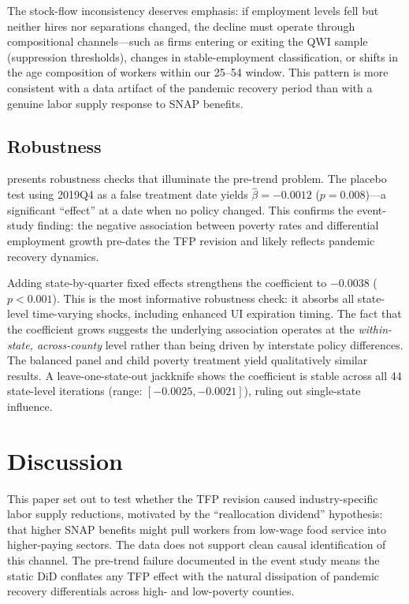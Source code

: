 \documentclass[12pt]{article}
\begin{document}
The stock-flow inconsistency deserves emphasis: if employment levels fell but neither hires nor separations changed, the decline must operate through compositional channels---such as firms entering or exiting the QWI sample (suppression thresholds), changes in stable-employment classification, or shifts in the age composition of workers within our 25--54 window. This pattern is more consistent with a data artifact of the pandemic recovery period than with a genuine labor supply response to SNAP benefits.

\subsection{Robustness}



 presents robustness checks that illuminate the pre-trend problem. The placebo test using 2019Q4 as a false treatment date yields $\hat{\beta} = -0.0012$ ($p = 0.008$)---a significant ``effect'' at a date when no policy changed. This confirms the event-study finding: the negative association between poverty rates and differential employment growth pre-dates the TFP revision and likely reflects pandemic recovery dynamics.

Adding state-by-quarter fixed effects strengthens the coefficient to $-0.0038$ ($p < 0.001$). This is the most informative robustness check: it absorbs all state-level time-varying shocks, including enhanced UI expiration timing. The fact that the coefficient grows suggests the underlying association operates at the \textit{within-state, across-county} level rather than being driven by interstate policy differences. The balanced panel and child poverty treatment yield qualitatively similar results. A leave-one-state-out jackknife shows the coefficient is stable across all 44 state-level iterations (range: $[-0.0025, -0.0021]$), ruling out single-state influence.


\section{Discussion}

This paper set out to test whether the TFP revision caused industry-specific labor supply reductions, motivated by the ``reallocation dividend'' hypothesis: that higher SNAP benefits might pull workers from low-wage food service into higher-paying sectors. The data does not support clean causal identification of this channel. The pre-trend failure documented in the event study means the static DiD conflates any TFP effect with the natural dissipation of pandemic recovery differentials across high- and low-poverty counties.
\end{document}
